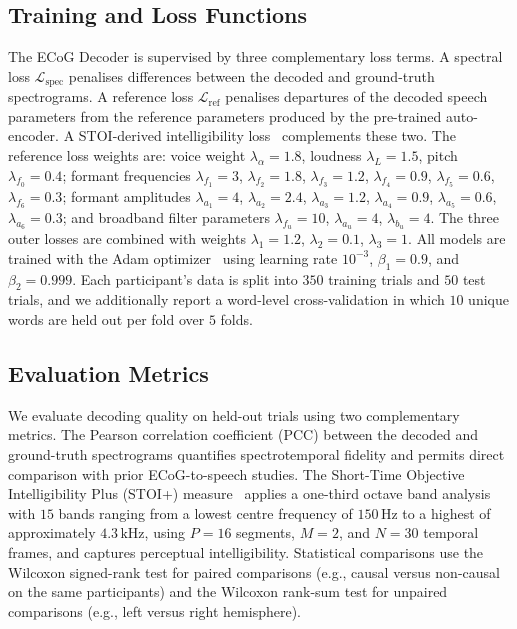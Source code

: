\documentclass[11pt]{article}
\begin{document}
\subsection{Training and Loss Functions}

The ECoG Decoder is supervised by three complementary loss terms. A
spectral loss $\mathcal{L}_{\mathrm{spec}}$ penalises differences between
the decoded and ground-truth spectrograms. A reference loss
$\mathcal{L}_{\mathrm{ref}}$ penalises departures of the decoded speech
parameters from the reference parameters produced by the pre-trained
auto-encoder. A STOI-derived intelligibility loss~\cite{taal2011algorithm,relanoiborra2016sepsm}
complements these two.
The reference loss weights are: voice weight $\lambda_\alpha = 1.8$,
loudness $\lambda_L = 1.5$, pitch $\lambda_{f_0} = 0.4$; formant
frequencies $\lambda_{f_1}=3$, $\lambda_{f_2}=1.8$, $\lambda_{f_3}=1.2$,
$\lambda_{f_4}=0.9$, $\lambda_{f_5}=0.6$, $\lambda_{f_6}=0.3$; formant
amplitudes $\lambda_{a_1}=4$, $\lambda_{a_2}=2.4$, $\lambda_{a_3}=1.2$,
$\lambda_{a_4}=0.9$, $\lambda_{a_5}=0.6$, $\lambda_{a_6}=0.3$; and
broadband filter parameters $\lambda_{f_u}=10$, $\lambda_{a_u}=4$,
$\lambda_{b_u}=4$. The three outer losses are combined with weights
$\lambda_1=1.2$, $\lambda_2=0.1$, $\lambda_3=1$. All models are trained
with the Adam optimizer~\cite{kingma2015adam} using learning rate
$10^{-3}$, $\beta_1=0.9$, and $\beta_2=0.999$. Each participant's data is
split into $350$ training trials and $50$ test trials, and we additionally
report a word-level cross-validation in which $10$ unique words are held
out per fold over $5$ folds.

\subsection{Evaluation Metrics}

We evaluate decoding quality on held-out trials using two complementary
metrics. The Pearson correlation coefficient (PCC) between the decoded and
ground-truth spectrograms quantifies spectrotemporal fidelity and permits
direct comparison with prior ECoG-to-speech studies. The Short-Time
Objective Intelligibility Plus (STOI+) measure~\cite{taal2011algorithm}
applies a one-third octave band analysis with $15$ bands ranging from a
lowest centre frequency of $150\,\mathrm{Hz}$ to a highest of
approximately $4.3\,\mathrm{kHz}$, using $P=16$ segments, $M=2$, and
$N=30$ temporal frames, and captures perceptual intelligibility.
Statistical comparisons use the Wilcoxon signed-rank test for paired
comparisons (e.g., causal versus non-causal on the same participants) and
the Wilcoxon rank-sum test for unpaired comparisons (e.g., left versus
right hemisphere).
\end{document}

